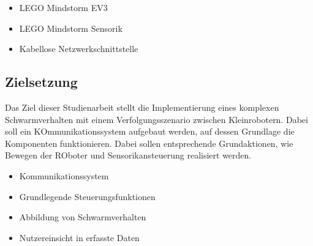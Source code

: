 \begin{itemize}
	\item LEGO Mindstorm EV3
	\item LEGO Mindstorm Sensorik
	\item Kabellose Netzwerkschnittstelle
\end{itemize}

\begin{comment}
	Die Aufgangslage stellen die einzelnen ROboter dar, die unter der Mindstorm SOftware funktionieren und dadurch einzeln agieren können. Dabei ist keinerlei Kommunikation zwischen den einzelnen ROboter möglich und somit keinerlei Realisierung für ein Schwarmverhalten. Die Roboter haben verschiedene Möglichkeiten durch WLAN, Bluetooth zur KOmmunikation, wobei keines von LEGO MIndstorm dirket zur Verfügung steht. Diese Schnittstellen werden lediglich zur Nutzerinteraktion, sowie dem drahtlosen starten und debuugen der Software genutzt.
\end{comment}

\subsection{Zielsetzung}

Das Ziel dieser Studienarbeit stellt die Implementierung eines komplexen Schwarmverhalten mit einem Verfolgungsszenario zwischen Kleinrobotern. Dabei soll ein KOmmunikationssystem aufgebaut werden, auf dessen Grundlage die Komponenten funktionieren. Dabei sollen entsprechende Grundaktionen, wie Bewegen der ROboter und Sensorikansteuerung realisiert werden.

\begin{itemize}
	\item Kommunikationssystem
	\item Grundlegende Steuerungsfunktionen
	\item Abbildung von Schwarmverhalten
	\item Nutzereinsicht in erfasste Daten
\end{itemize}

\begin{comment}
	\subsection{Erwartetes Ergebnis}
	
	Erwartet wird ein Ergebnis, indem der Nutzer des Systems über eine mobile App mithilfe einer zentralen STeuereinheit einen beliebigen Kontext für ein ausgewähltes Schwarmverhalten starten kann. Dabei soll eine abstrakte IMplementierung beachtet werden, indem verschiedene RObotertypen und Szenarien für Schwarmverhalten dargestellt sind, um wenn erwünscht ein komplexes Szanrio mit unterschiedlichen RObotern zu starten um definierte AUfgaben zu lösen. Dabei ist vor allem die Implementierung der Grundsteuerung mitsammt der Kommunikation des Systems entscheident.
\end{comment}
